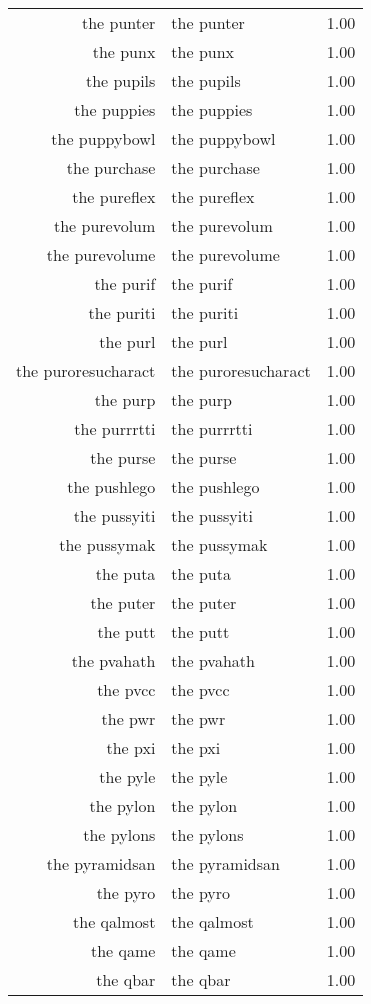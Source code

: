 \begin{table}[ht]
\begin{tabular}{rlr}
  the punter & the punter & 1.00 \\ 
  the punx & the punx & 1.00 \\ 
  the pupils & the pupils & 1.00 \\ 
  the puppies & the puppies & 1.00 \\ 
  the puppybowl & the puppybowl & 1.00 \\ 
  the purchase & the purchase & 1.00 \\ 
  the pureflex & the pureflex & 1.00 \\ 
  the purevolum & the purevolum & 1.00 \\ 
  the purevolume & the purevolume & 1.00 \\ 
  the purif & the purif & 1.00 \\ 
  the puriti & the puriti & 1.00 \\ 
  the purl & the purl & 1.00 \\ 
  the puroresucharact & the puroresucharact & 1.00 \\ 
  the purp & the purp & 1.00 \\ 
  the purrrtti & the purrrtti & 1.00 \\ 
  the purse & the purse & 1.00 \\ 
  the pushlego & the pushlego & 1.00 \\ 
  the pussyiti & the pussyiti & 1.00 \\ 
  the pussymak & the pussymak & 1.00 \\ 
  the puta & the puta & 1.00 \\ 
  the puter & the puter & 1.00 \\ 
  the putt & the putt & 1.00 \\ 
  the pvahath & the pvahath & 1.00 \\ 
  the pvcc & the pvcc & 1.00 \\ 
  the pwr & the pwr & 1.00 \\ 
  the pxi & the pxi & 1.00 \\ 
  the pyle & the pyle & 1.00 \\ 
  the pylon & the pylon & 1.00 \\ 
  the pylons & the pylons & 1.00 \\ 
  the pyramidsan & the pyramidsan & 1.00 \\ 
  the pyro & the pyro & 1.00 \\ 
  the qalmost & the qalmost & 1.00 \\ 
  the qame & the qame & 1.00 \\ 
  the qbar & the qbar & 1.00 \\ 

\end{tabular}
\end{table}
